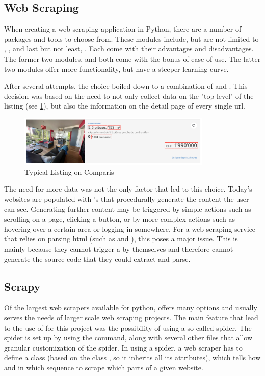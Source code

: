 \documentclass[main]{subfiles}
\begin{document}
\subsection{Web Scraping}

When creating a web scraping application in Python, there are a number of packages and tools to choose from.
These modules include, but are not limited to \request, \beautifulsoup, \scrapy and last but not least, \selenium.
Each come with their advantages and disadvantages. 
The former two modules, \pkg[requests] and \beautifulsoup both come with the bonus of ease of use.
The latter two modules offer more functionality, but have a steeper learning curve.

After several attempts, the choice boiled down to a combination of \selenium and \scrapy.
This decision was based on the need to not only collect data on the "top level" of the listing (see \ref{fig:listing}), 
but also the information on the detail page of every single \acs*{url}.

\begin{figure}[htbp]
    \centerline{
        \includegraphics[width = 92mm]{prog_1.png}}
    \caption{Typical Listing on Comparis}
    \label{fig:listing}
\end{figure}

The need for more data was not the only factor that led to this choice.
Today's websites are populated with \js's that procedurally generate the content the user can see.
Generating further content may be triggered by simple actions such as scrolling on a page,
clicking a button, or by more complex actions such as hovering over a certain area or logging in somewhere.
For a web scraping service that relies on parsing \acs*{html} (such as \request and \beautifulsoup), this poses a major issue.
This is mainly because they cannot trigger a \js  by themselves and therefore cannot generate the source code that they could extract and parse.

\subsection{Scrapy}
Of the largest web scrapers available for python, \scrapy offers many options and usually serves the needs of larger scale web scraping projects.
The main feature that lead to the use of \scrapy for this project was the possibility of using a so-called spider.
The spider is set up by using the  command, 
along with several other files that allow granular customization of the spider.
In using a spider, a web scraper has to define a class (based on the class , so it inherits all its attributes),
which tells \scrapy how and in which sequence to scrape which parts of a given website.
\end{document}
